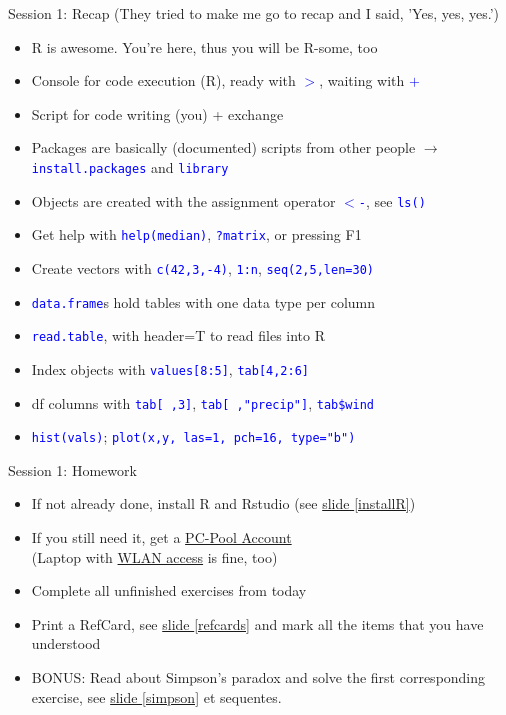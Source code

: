 \documentclass[xcolor=table,           xcolor=dvipsnames]{beamer}\usepackage[]{graphicx}\usepackage[]{color}
\newcommand{\rcode}[1]{\texttt{\textcolor{Blue}{#1}}} %
\begin{document}
\begin{frame}{Session 1: Recap \footnotesize{(They tried to make me go to recap and I said, 'Yes, yes, yes.')}}
\pause
\begin{itemize}[<+->]
  \item R is awesome. You're here, thus you will be R-some, too
  \item Console for code execution (R), ready with \rcode{$>$}, waiting with \rcode{$+$}
  \item Script for code writing (you) + exchange
  \item Packages are basically (documented) scripts from other people $\rightarrow$ \rcode{install.packages} and \rcode{library}
  \item Objects are created with the assignment operator \rcode{$<$-}, see \rcode{ls()} %
  \item Get help with \rcode{help(median)}, \rcode{?matrix}, or pressing F1
  \item Create vectors with \rcode{c(42,3,-4)}, \rcode{1:n}, \rcode{seq(2,5,len=30)}
  \item \rcode{data.frame}s hold tables with one data type per column
  \item \rcode{read.table}, with header=T to read files into R
  \item Index objects with \rcode{values[8:5]}, \rcode{tab[4,2:6]}
  \item df columns with \rcode{tab[ ,3]}, \rcode{tab[ ,"precip"]}, \rcode{tab\$wind}
  \item \rcode{hist(vals)}; \rcode{plot(x,y, las=1, pch=16, type="b")}
\end{itemize}
\end{frame}


\begin{frame}{Session 1: Homework}
\pause
\begin{itemize}[<+->]
  \item If not already done, install R and Rstudio (see \hyperlink{installR}{slide \ref{installR}})
  \item If you still need it, get a \href{http://www.chem.uni-potsdam.de/groups/pools/Studierende/studierende.html}{PC-Pool Account} \\(Laptop with \href{http://www.zeik.uni-potsdam.de/wlan.html}{WLAN access} is fine, too)
  \item Complete all unfinished exercises from today
  \item Print a RefCard, see \hyperlink{refcards}{slide \ref{refcards}} and mark all the items that you have understood
  \item BONUS: Read about Simpson's paradox and solve the first corresponding exercise, see \hyperlink{simpson}{slide \ref{simpson}} et sequentes.
\end{itemize}
\end{frame}
\end{document}
